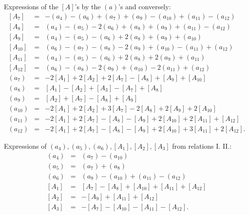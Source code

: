 \documentclass[10pt]{article}
\begin{document}
\noindent Expressions of the \([A]\)'s by the \((a)\)'s and conversely:
\[
\begin{array}{rcl}
{}[A_7]&=&-(a_4)-(a_6)+(a_7)+(a_9)-(a_{10})+(a_{11})-(a_{12})\\
{}[A_8]&=&(a_4)-(a_5)-2(a_6)+(a_8)+(a_9)+(a_{11})-(a_{12})\\
{}[A_9]&=&(a_4)-(a_5)-(a_6)+2(a_8)+(a_9)+(a_{10})\\
{}[A_{10}]&=&(a_6)-(a_7)-(a_8)-2(a_9)+(a_{10})-(a_{11})+(a_{12})\\
{}[A_{11}]&=&(a_4)-(a_5)-(a_6)+2(a_8)+2(a_9)+(a_{11})\\
{}[A_{12}]&=&(a_6)-(a_8)-2(a_9)+(a_{10})-2(a_{11})+(a_{12})\\[0.3em]
(a_7)&=&-2[A_1]+2[A_2]+2[A_7]-[A_8]+[A_9]+[A_{10}]\\
(a_8)&=&[A_1]-[A_2]+[A_3]-[A_7]+[A_8]\\
(a_9)&=&[A_2]+[A_7]-[A_8]+[A_9]\\
(a_{10})&=&-2[A_1]+2[A_2]+3[A_7]-2[A_8]+2[A_9]+2[A_{10}]\\
(a_{11})&=&-2[A_1]+2[A_7]-[A_8]-[A_9]+2[A_{10}]+2[A_{11}]+[A_{12}]\\
(a_{12})&=&-2[A_1]+2[A_7]-[A_8]-[A_9]+2[A_{10}]+3[A_{11}]+2[A_{12}].
\end{array}
\]

\noindent Expressions of \((a_4),(a_5),(a_6),[A_1],[A_2],[A_3]\) from relations I. II.:
\[
\begin{array}{rcl}
(a_4)&=&(a_7)-(a_{10})\\
(a_5)&=&(a_7)+(a_8)\\
(a_6)&=&(a_9)-(a_{10})+(a_{11})-(a_{12})\\
{}[A_1]&=&[A_7]-[A_8]+[A_{10}]+[A_{11}]+[A_{12}]\\
{}[A_2]&=&-[A_9]+[A_{11}]+[A_{12}]\\
{}[A_3]&=&-[A_7]-[A_{10}]-[A_{11}]-[A_{12}].
\end{array}
\]
\end{document}
